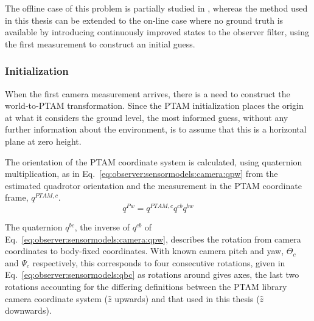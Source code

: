     The offline case of this problem is partially studied in \citep{hayashi2010},
    whereas the method used in this thesis can be extended to the on-line
    case where no ground truth is available by introducing continuously improved
    states to the observer filter, using the first measurement to construct
    an initial guess.


    \subsubsection{Initialization}
        \label{sssec:observer:sensormodels:camera:initialization}
        When the first camera measurement arrives, there is a need to construct
        the world-to-PTAM transformation.
        Since the PTAM initialization places the origin at what it
        considers the ground level, the most informed guess,
        without any further information about the environment, is
        to assume that this is a horizontal plane at zero height.

        The orientation of the PTAM coordinate system is calculated,
        using quaternion multiplication, as in Eq.~\eqref{eq:observer:sensormodels:camera:qpw}
        from the estimated quadrotor orientation and the measurement in the
        PTAM coordinate frame, $q^{PTAM,c}$.
        \begin{equation}
            \label{eq:observer:sensormodels:camera:qpw}
            q^{Pw} = q^{PTAM,c} q^{cb} q^{bw}
        \end{equation}

        The quaternion $q^{bc}$, the inverse of $q^{cb}$ of Eq.~\eqref{eq:observer:sensormodels:camera:qpw},
        describes the rotation from camera coordinates to body-fixed coordinates.
        With known camera pitch and yaw, $\Theta_{c}$ and $\Psi_{c}$ respectively,
        this corresponds to four consecutive rotations, given in
        Eq.~\eqref{eq:observer:sensormodels:qbc} as rotations around gives axes,
        the last two rotations accounting for the differing definitions between the PTAM library
        camera coordinate system ($\hat{z}$ upwards) and that used in this thesis ($\hat{z}$ downwards).

